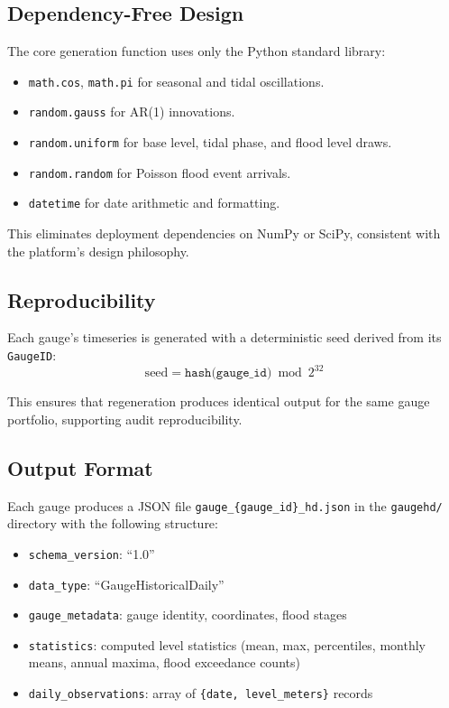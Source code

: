 \documentclass[11pt,a4paper]{article}
\begin{document}
\subsection{Dependency-Free Design}

The core generation function uses only the Python standard library:
\begin{itemize}[nosep]
    \item \texttt{math.cos}, \texttt{math.pi} for seasonal and tidal oscillations.
    \item \texttt{random.gauss} for AR(1) innovations.
    \item \texttt{random.uniform} for base level, tidal phase, and flood level draws.
    \item \texttt{random.random} for Poisson flood event arrivals.
    \item \texttt{datetime} for date arithmetic and formatting.
\end{itemize}

\noindent This eliminates deployment dependencies on NumPy or SciPy, consistent with the
platform's design philosophy.

\subsection{Reproducibility}

Each gauge's timeseries is generated with a deterministic seed derived from its
\texttt{GaugeID}:
\begin{equation}
    \text{seed} = \texttt{hash(gauge\_id)} \bmod 2^{32}
    \label{eq:seed}
\end{equation}

\noindent This ensures that regeneration produces identical output for the same gauge
portfolio, supporting audit reproducibility.

\subsection{Output Format}

Each gauge produces a JSON file \texttt{gauge\_\{gauge\_id\}\_hd.json} in the
\texttt{gaugehd/} directory with the following structure:

\begin{itemize}[nosep]
    \item \texttt{schema\_version}: ``1.0''
    \item \texttt{data\_type}: ``GaugeHistoricalDaily''
    \item \texttt{gauge\_metadata}: gauge identity, coordinates, flood stages
    \item \texttt{statistics}: computed level statistics (mean, max, percentiles,
          monthly means, annual maxima, flood exceedance counts)
    \item \texttt{daily\_observations}: array of \texttt{\{date, level\_meters\}} records
\end{itemize}
\end{document}
